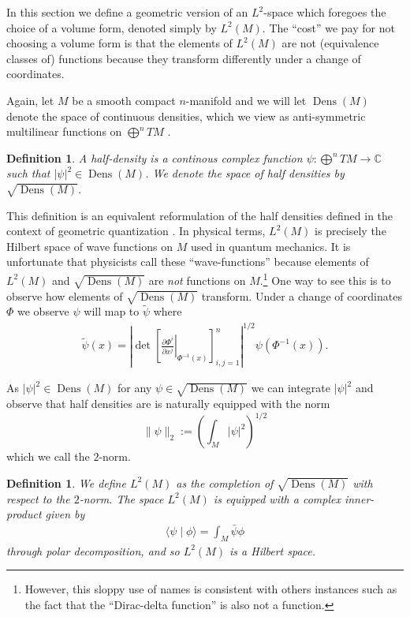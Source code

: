 \documentclass[12pt]{amsart}
\newcommand{\pder}[2]{\ensuremath{\frac{ \partial #1}{\partial #2}}}
\newtheorem{defn}[thm]{Definition}
\DeclareMathOperator{\Dens}{Dens}
\begin{document}
In this section we define a geometric version of an $L^{2}$-space which foregoes the choice of a volume form, denoted simply by $L^{2}(M)$.
The ``cost'' we pay for not choosing a volume form is that the elements of $L^{2}(M)$ are not (equivalence classes of) functions because they transform differently under a change of coordinates.

Again, let $M$ be a smooth compact $n$-manifold
and we will let $\Dens(M)$ denote the space of continuous densities,
which we view as anti-symmetric multilinear functions on $\bigoplus^n TM$ \cite[Chapter 16]{Lee2006}.

\begin{defn}\label{def:half density}
	A half-density is a continous complex function $\psi : \bigoplus^n TM \to \mathbb{C}$
	such that $| \psi |^{2} \in \Dens(M)$.
	We denote the space of half densities by $\sqrt{\Dens(M)}$.
\end{defn}

This definition is an equivalent reformulation of the half densities defined in the context of geometric quantization \cite{GuilleminSternberg1970,BatesWeinstein1997}.
In physical terms, $L^{2}(M)$ is precisely the Hilbert space of wave functions on $M$ used in quantum mechanics.
It is unfortunate that physicists call these ``wave-functions''
because elements of $L^{2}(M)$ and $\sqrt{\Dens(M)}$ are \emph{not} functions on $M$.\footnote{However, this sloppy use of names is consistent with others instances such as the fact that the ``Dirac-delta function'' is also not a function.}
One way to see this is to observe how elements of $\sqrt{\Dens(M)}$ transform.
Under a change of coordinates $\Phi$ we observe $\psi$ will map to $\tilde \psi$ where
\begin{align}
	\tilde{\psi}(x)  =  \left| \det \left[ \left. \pder{\Phi^{i}}{x^{j}} \right|_{\Phi^{-1}(x)} \right]_{i,j=1}^{n} \right|^{1/2} \psi( \Phi^{-1}(x) ). \label{eq:transformation law}
\end{align}


As $|\psi|^{2} \in \Dens(M)$ for any $\psi \in \sqrt{\Dens(M)}$ we can integrate $|\psi|^{2}$
and observe that half densities are is naturally equipped with the norm $$\| \psi \|_2 :=  \left( \int_M |\psi|^2 \right)^{1/2}$$ which we call the $2$-norm.

\begin{defn}
	We define $L^{2}(M)$ as the completion of $\sqrt{ \Dens(M)}$ with respect to the $2$-norm.
	The space $L^{2}(M)$ is equipped with a complex inner-product given by
	\begin{align*}
		\langle \psi \mid \phi \rangle = \int_{M} \bar \psi \phi
	\end{align*}
	through polar decomposition, and so $L^{2}(M)$ is a Hilbert space.
\end{defn}
\end{document}
